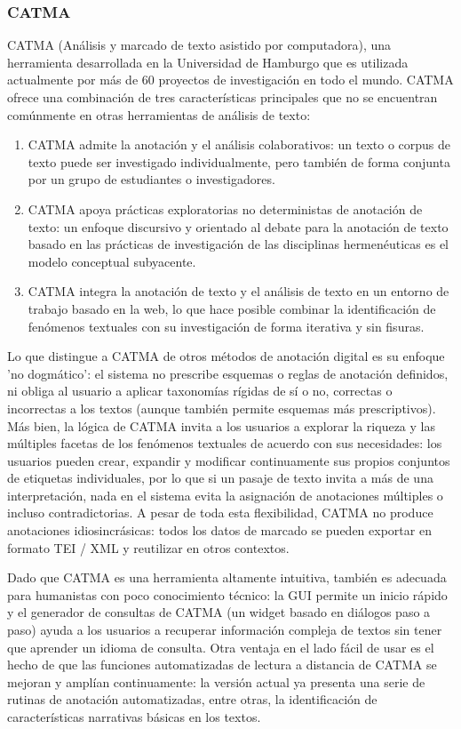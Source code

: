 \subsubsection*{CATMA}

CATMA (Análisis y marcado de texto asistido por computadora), una herramienta desarrollada en la Universidad de Hamburgo que es utilizada actualmente por más de 60 proyectos de investigación en todo el mundo.
CATMA ofrece una combinación de tres características principales que no se encuentran comúnmente en otras herramientas de análisis de texto:

\begin{enumerate}
  \item CATMA admite la anotación y el análisis colaborativos: un texto o corpus de texto puede ser investigado individualmente, pero también de forma conjunta por un grupo de estudiantes o investigadores.
  \item  CATMA apoya prácticas exploratorias no deterministas de anotación de texto: un enfoque discursivo y orientado al debate para la anotación de texto basado en las prácticas de investigación de las disciplinas hermenéuticas es el modelo conceptual subyacente.
  \item CATMA integra la anotación de texto y el análisis de texto en un entorno de trabajo basado en la web, lo que hace posible combinar la identificación de fenómenos textuales con su investigación de forma iterativa y sin fisuras.
\end{enumerate}

Lo que distingue a CATMA de otros métodos de anotación digital es su enfoque 'no dogmático': el sistema no prescribe esquemas o reglas de anotación definidos, ni obliga al usuario a aplicar taxonomías rígidas de sí o no, correctas o incorrectas a los textos (aunque también permite esquemas más prescriptivos).
Más bien, la lógica de CATMA invita a los usuarios a explorar la riqueza y las múltiples facetas de los fenómenos textuales de acuerdo con sus necesidades: los usuarios pueden crear, expandir y modificar continuamente sus propios conjuntos de etiquetas individuales, por lo que si un pasaje de texto invita a más de una interpretación, nada en el sistema evita la asignación de anotaciones múltiples o incluso contradictorias.
A pesar de toda esta flexibilidad, CATMA no produce anotaciones idiosincrásicas: todos los datos de marcado se pueden exportar en formato TEI / XML y reutilizar en otros contextos.

Dado que CATMA es una herramienta altamente intuitiva, también es adecuada para humanistas con poco conocimiento técnico: la GUI permite un inicio rápido y el generador de consultas de CATMA (un widget basado en diálogos paso a paso) ayuda a los usuarios a recuperar información compleja de textos sin tener que aprender un idioma de consulta.
Otra ventaja en el lado fácil de usar es el hecho de que las funciones automatizadas de lectura a distancia de CATMA se mejoran y amplían continuamente: la versión actual ya presenta una serie de rutinas de anotación automatizadas, entre otras, la identificación de características narrativas básicas en los textos.

